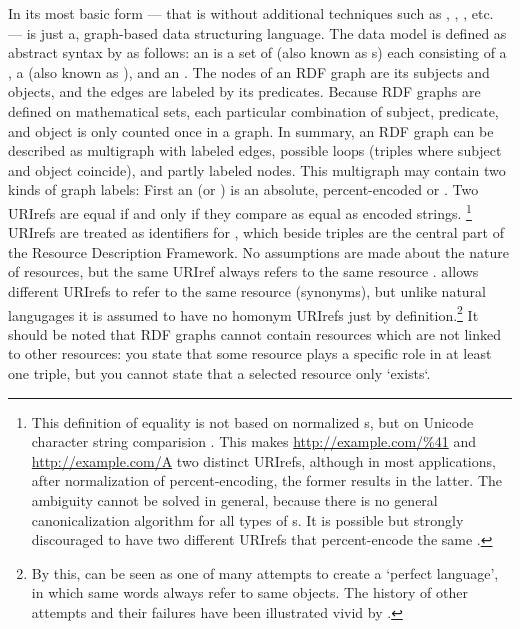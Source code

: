 In its most basic form --- that is without additional techniques such as 
, , , etc. ---  is just a, graph-based 
data structuring language. The  data model is defined as abstract 
syntax by \textcite{Klyne2004} as follows: an  
is a set of  (also known as s)
each consisting of a , a 
(also known as ), and an .
The nodes of an RDF graph are its subjects and objects, and the edges are labeled by
its predicates. Because RDF graphs are defined on mathematical sets, each particular 
combination of subject, predicate, and object is only counted once in a graph.
In summary, an RDF graph can be described as multigraph with labeled edges, possible
loops (triples where subject and object coincide), and partly labeled nodes. This 
multigraph may contain two kinds of graph labels: First an  
(or ) is an absolute, percent-encoded  or . 
Two URIrefs are equal if and only if they compare as equal as encoded strings.%
\label{term:uriref}%
\footnote{This definition of equality is not based on normalized s, but 
on Unicode character string comparision \cite[6.4]{Klyne2004}. This makes 
\url{http://example.com/\%41} and \url{http://example.com/A} two distinct URIrefs, 
although in most applications, after normalization of percent-encoding, the former 
results in the latter. The ambiguity cannot be solved in general, because there
is no general canonicalization algorithm for all types of s. It is 
possible but strongly discouraged to have two different URIrefs that 
percent-encode the same .} URIrefs are treated as identifiers
for , which beside triples are the central 
part of the Resource Description Framework. No assumptions are made about the 
nature of resources, but the same URIref always refers to the same resource
\cite[section 1.2]{Hayes2004}.  allows different URIrefs to refer to
the same resource (synonyms), but unlike natural langugages it is assumed to
have no homonym URIrefs just by definition.\footnote{By this, 
can be seen as one of many attempts to create a `perfect language', in which same
words always refer to same objects. The history of other attempts and their
failures have been illustrated vivid by \textcite{Eco1995}.}
It should be noted that RDF graphs cannot contain resources which are not linked
to other resources: you state that some resource plays a specific role in at least
one  triple, but you cannot state that a selected resource only `exists`.

